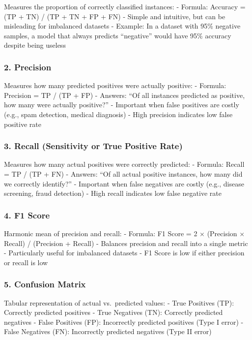 \documentclass[
  letterpaper,
  DIV=11,
  numbers=noendperiod]{scrreprt}
\begin{document}
Measures the proportion of correctly classified instances: - Formula:
Accuracy = (TP + TN) / (TP + TN + FP + FN) - Simple and intuitive, but
can be misleading for imbalanced datasets - Example: In a dataset with
95\% negative samples, a model that always predicts ``negative'' would
have 95\% accuracy despite being useless

\subsubsection{2. Precision}\label{precision}

Measures how many predicted positives were actually positive: - Formula:
Precision = TP / (TP + FP) - Answers: ``Of all instances predicted as
positive, how many were actually positive?'' - Important when false
positives are costly (e.g., spam detection, medical diagnosis) - High
precision indicates low false positive rate

\subsubsection{3. Recall (Sensitivity or True Positive
Rate)}\label{recall-sensitivity-or-true-positive-rate}

Measures how many actual positives were correctly predicted: - Formula:
Recall = TP / (TP + FN) - Answers: ``Of all actual positive instances,
how many did we correctly identify?'' - Important when false negatives
are costly (e.g., disease screening, fraud detection) - High recall
indicates low false negative rate

\subsubsection{4. F1 Score}\label{f1-score}

Harmonic mean of precision and recall: - Formula: F1 Score = 2 ×
(Precision × Recall) / (Precision + Recall) - Balances precision and
recall into a single metric - Particularly useful for imbalanced
datasets - F1 Score is low if either precision or recall is low

\subsubsection{5. Confusion Matrix}\label{confusion-matrix}

Tabular representation of actual vs.~predicted values: - True Positives
(TP): Correctly predicted positives - True Negatives (TN): Correctly
predicted negatives - False Positives (FP): Incorrectly predicted
positives (Type I error) - False Negatives (FN): Incorrectly predicted
negatives (Type II error)
\end{document}
